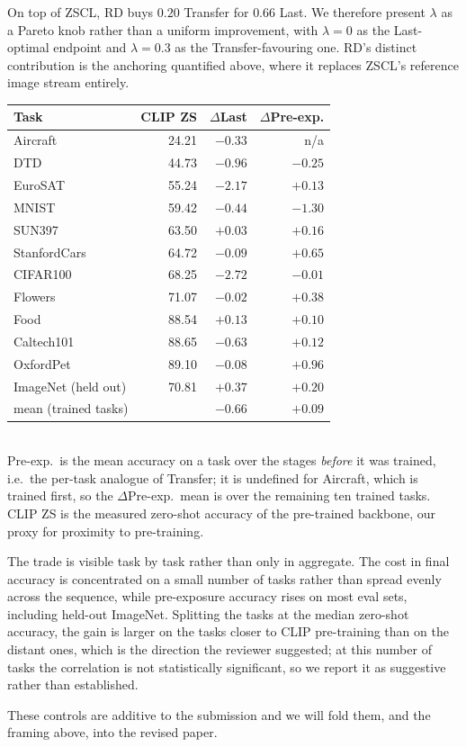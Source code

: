 \noindent On top of ZSCL, RD buys $0.20$ Transfer for $0.66$ Last. We therefore
present $\lambda$ as a Pareto knob rather than a uniform improvement, with
$\lambda{=}0$ as the Last-optimal endpoint and $\lambda{=}0.3$ as the
Transfer-favouring one. RD's distinct contribution is the anchoring quantified
above, where it replaces ZSCL's reference image stream entirely.

\begin{table}[h]\centering\small
\begin{tabular}{lrrr}
\hline
\textbf{Task} & \textbf{CLIP ZS} & \textbf{$\Delta$Last} & \textbf{$\Delta$Pre-exp.} \\
\hline
Aircraft      & 24.21 & $-0.33$ & n/a \\
DTD           & 44.73 & $-0.96$ & $-0.25$ \\
EuroSAT       & 55.24 & $-2.17$ & $+0.13$ \\
MNIST         & 59.42 & $-0.44$ & $-1.30$ \\
SUN397        & 63.50 & $+0.03$ & $+0.16$ \\
StanfordCars  & 64.72 & $-0.09$ & $+0.65$ \\
CIFAR100      & 68.25 & $-2.72$ & $-0.01$ \\
Flowers       & 71.07 & $-0.02$ & $+0.38$ \\
Food          & 88.54 & $+0.13$ & $+0.10$ \\
Caltech101    & 88.65 & $-0.63$ & $+0.12$ \\
OxfordPet     & 89.10 & $-0.08$ & $+0.96$ \\
ImageNet (held out) & 70.81 & $+0.37$ & $+0.20$ \\
\hline
mean (trained tasks) & & $-0.66$ & $+0.09$ \\
\hline
\end{tabular}
\\[2pt]
{\small Pre-exp.\ is the mean accuracy on a task over the stages \emph{before}
it was trained, i.e.\ the per-task analogue of Transfer; it is undefined for
Aircraft, which is trained first, so the $\Delta$Pre-exp.\ mean is over the
remaining ten trained tasks. CLIP ZS is the measured zero-shot accuracy of the
pre-trained backbone, our proxy for proximity to pre-training.}
\end{table}

\noindent The trade is visible task by task rather than only in aggregate. The
cost in final accuracy is concentrated on a small number of tasks rather than
spread evenly across the sequence, while pre-exposure accuracy rises on most
eval sets, including held-out ImageNet. Splitting the tasks at the median
zero-shot accuracy, the gain is larger on the tasks closer to CLIP pre-training
than on the distant ones, which is the direction the reviewer suggested; at this
number of tasks the correlation is not statistically significant, so we report
it as suggestive rather than established.

\noindent These controls are additive to the submission and we will fold them,
and the framing above, into the revised paper.

